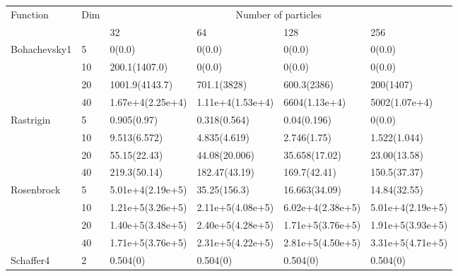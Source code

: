 \begin{tabular}{|l|l|l|l|l|l|}
\hline
\multirow{2}{*}{Function} & \multirow{2}{*}{Dim} & \multicolumn{4}{c|}{Number of particles}                                                          \\ \cmidrule{3-6}
                          &                      & 32                     & 64                     & 128                    & 256                    \\ \hline
Bohachevsky1              & 5                    & 0(0.0)                 & 0(0.0)                 & 0(0.0)                 & 0(0.0)                 \\ \cmidrule{2-6}
                          & 10                   & 200.1(1407.0)      & 0(0.0)                 & 0(0.0)                 & 0(0.0)                 \\ \cmidrule{2-6}
                          & 20                   & 1001.9(4143.7)     & 701.1(3828)      & 600.3(2386)      & 200(1407)      \\ \cmidrule{2-6}
                          & 40                   & 1.67e+4(2.25e+4)   & 1.11e+4(1.53e+4)   & 6604(1.13e+4)    & 5002(1.07e+4)    \\ \hline
Rastrigin                 & 5                    & 0.905(0.97)            & 0.318(0.564)           & 0.04(0.196)            & 0(0.0)                 \\ \cmidrule{2-6}
                          & 10                   & 9.513(6.572)           & 4.835(4.619)           & 2.746(1.75)            & 1.522(1.044)           \\ \cmidrule{2-6}
                          & 20                   & 55.15(22.43)         & 44.08(20.006)          & 35.658(17.02)         & 23.00(13.58)         \\ \cmidrule{2-6}
                          & 40                   & 219.3(50.14)         & 182.47(43.19)        & 169.7(42.41)        & 150.5(37.37)        \\ \hline
Rosenbrock                & 5                    & 5.01e+4(2.19e+5)   & 35.25(156.3)        & 16.663(34.09)          & 14.84(32.55)         \\ \cmidrule{2-6}
                          & 10                   & 1.21e+5(3.26e+5) & 2.11e+5(4.08e+5) & 6.02e+4(2.38e+5)  & 5.01e+4(2.19e+5)  \\ \cmidrule{2-6}
                          & 20                   & 1.40e+5(3.48e+5)  & 2.40e+5(4.28e+5) & 1.71e+5(3.76e+5) & 1.91e+5(3.93e+5) \\ \cmidrule{2-6}
                          & 40                   & 1.71e+5(3.76e+5) & 2.31e+5(4.22e+5) & 2.81e+5(4.50e+5) & 3.31e+5(4.71e+5)  \\ \hline
Schaffer4                 & 2                    & 0.504(0)               & 0.504(0)               & 0.504(0)               & 0.504(0)               \\ \hline
\end{tabular}
